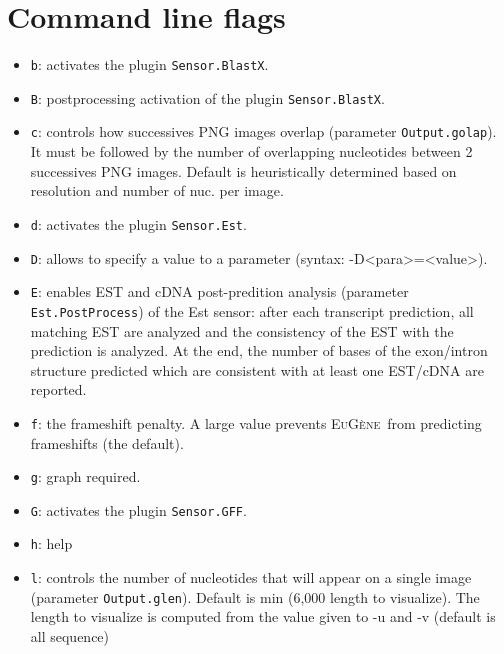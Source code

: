 \documentclass[a4paper,titlepage]{report}
\newcommand{\EuGene}{\textsc{EuG\`ene}}
\begin{document}
\section{Command line flags}
 
\begin{itemize}

\item \texttt{b}: activates the plugin \texttt{Sensor.BlastX}.

\item \texttt{B}: postprocessing activation of the plugin \texttt{Sensor.BlastX}.
  
\item \texttt{c}: controls how successives PNG images overlap (parameter
  \texttt{Output.golap}). It must be followed by the number of
  overlapping nucleotides between 2 successives PNG images. Default is
  heuristically determined based on resolution and number of nuc. per
  image.
 
\item \texttt{d}: activates the plugin \texttt{Sensor.Est}.

\item \texttt{D}: allows to specify a value to a parameter (syntax: -D<para>=<value>).
  
\item \texttt{E}: enables EST and cDNA post-predition analysis (parameter
  \texttt{Est.PostProcess}) of the Est sensor: after each transcript
  prediction, all matching EST are analyzed and the consistency of the
  EST with the prediction is analyzed. At the end, the number of bases
  of the exon/intron structure predicted which are consistent with at
  least one EST/cDNA are reported.

\item \texttt{f}: the frameshift penalty. A large value prevents
  \EuGene\ from predicting frameshifts (the default).

\item \texttt{g}: graph required.

\item \texttt{G}: activates the plugin \texttt{Sensor.GFF}.

\item \texttt{h}: help 
   
\item \texttt{l}: controls the number of nucleotides that will appear on a
  single image (parameter \texttt{Output.glen}). Default is min
  (6,000 length to visualize). The length to visualize is computed from
  the value given to -u and -v (default is all sequence)
 

\end{itemize}
\end{document}
